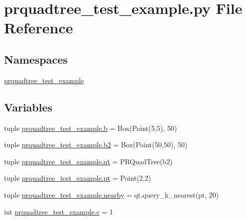 \section{prquadtree\+\_\+test\+\_\+example.\+py File Reference}
\label{prquadtree__test__example_8py}
\subsection*{Namespaces}
\begin{DoxyCompactItemize}
\item 
 \hyperlink{namespaceprquadtree__test__example}{prquadtree\+\_\+test\+\_\+example}
\end{DoxyCompactItemize}
\subsection*{Variables}
\begin{DoxyCompactItemize}
\item 
tuple \hyperlink{namespaceprquadtree__test__example_a430c6e4c1960cb0326d40a60be817d65}{prquadtree\+\_\+test\+\_\+example.\+b} = Box(Point(5,5), 50)
\item 
tuple \hyperlink{namespaceprquadtree__test__example_a6c76891a5f566a70e8ab91c9946be5a2}{prquadtree\+\_\+test\+\_\+example.\+b2} = Box(Point(50,50), 50)
\item 
tuple \hyperlink{namespaceprquadtree__test__example_a92699a8bb92121b0ffdac66d511f3359}{prquadtree\+\_\+test\+\_\+example.\+qt} = P\+R\+Quad\+Tree(b2)
\item 
tuple \hyperlink{namespaceprquadtree__test__example_ab0091dbc0243fa027e0bc7025d8ea3ad}{prquadtree\+\_\+test\+\_\+example.\+pt} = Point(2,2)
\item 
tuple \hyperlink{namespaceprquadtree__test__example_a2024920106d8770dc2cfa9da1e4fe410}{prquadtree\+\_\+test\+\_\+example.\+nearby} = qt.\+query\+\_\+k\+\_\+nearest(pt, 20)
\item 
int \hyperlink{namespaceprquadtree__test__example_a51f7199631c374c21ed3dada86cc3766}{prquadtree\+\_\+test\+\_\+example.\+c} = 1
\end{DoxyCompactItemize}

